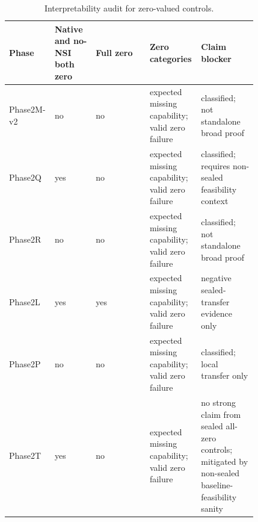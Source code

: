 \begin{table}[ht]
\centering
\footnotesize
\setlength{\tabcolsep}{3pt}
\caption{Interpretability audit for zero-valued controls.}
\label{tab:baseline-zero-summary}
\begin{tabular}{@{}>{\raggedright\arraybackslash}p{0.10\linewidth}>{\raggedright\arraybackslash}p{0.16\linewidth}>{\raggedright\arraybackslash}p{0.21\linewidth}>{\raggedright\arraybackslash}p{0.13\linewidth}>{\raggedright\arraybackslash}p{0.22\linewidth}@{}}
\toprule
Phase & Native and no-NSI both zero & Full zero & Zero categories & Claim blocker \\
\midrule
Phase2M-v2 & no & no & expected missing capability; valid zero failure & classified; not standalone broad proof \\
Phase2Q & yes & no & expected missing capability; valid zero failure & classified; requires non-sealed feasibility context \\
Phase2R & no & no & expected missing capability; valid zero failure & classified; not standalone broad proof \\
Phase2L & yes & yes & expected missing capability; valid zero failure & negative sealed-transfer evidence only \\
Phase2P & no & no & expected missing capability; valid zero failure & classified; local transfer only \\
Phase2T & yes & no & expected missing capability; valid zero failure & no strong claim from sealed all-zero controls; mitigated by non-sealed baseline-feasibility sanity \\
\bottomrule
\end{tabular}
\end{table}
